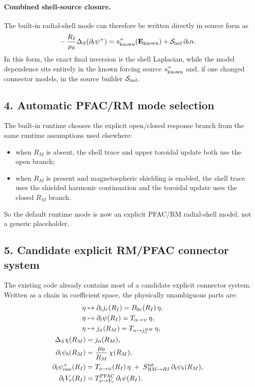 \documentclass[11pt,a4paper]{article}
\begin{document}
\paragraph{Combined shell-source closure.}
The built-in radial-shell mode can therefore be written directly in source
form as
\begin{equation}
-\,\frac{R_I}{\mu_0}\Delta_S(\partial_t\psi^+)
=
s_{\rm known}^+(\mathbf E_{\rm known})
+
\mathcal S_{\rm ind}\,\partial_t\alpha.
\label{eq:runtime_shell_source_split}
\end{equation}
In this form, the exact final inversion is the shell Laplacian, while the
model dependence sits entirely in the known forcing source
\(s_{\rm known}^+\) and, if one changed connector models, in the source
builder \(\mathcal S_{\rm ind}\).

\subsection*{4. Automatic PFAC/RM mode selection}

The built-in  runtime chooses the explicit open/closed
response branch from the same runtime assumptions used elsewhere:
\begin{itemize}
\item when $R_M$ is absent, the shell trace and upper toroidal update both use
the open branch;
\item when $R_M$ is present and magnetospheric shielding is enabled, the shell
trace uses the shielded harmonic continuation and the toroidal update uses the
closed $R_M$ branch.
\end{itemize}
So the default runtime  mode is now an explicit PFAC/RM
radial-shell model, not a generic placeholder.

\subsection*{5. Candidate explicit RM/PFAC connector system}

The existing code already contains most of a candidate explicit connector
system. Written as a chain in coefficient space, the physically unambiguous
parts are:
\begin{align}
\eta
&\mapsto
\partial_t j_r(R_I)
=
B_{0r}(R_I)\,\eta,
\\
\eta
&\mapsto
\partial_t\psi(R_I)
=
T_{\alpha\to\psi}\,\eta,
\\
\eta
&\mapsto
j_n(R_M)
=
T_{\alpha\to j_n^{RM}}\,\eta,
\\
\Delta_S \chi(R_M)
&=
j_n(R_M),
\\
\partial_t\psi_b(R_M)
&=
\frac{\mu_0}{R_M}\,\chi(R_M),
\\
\partial_t\psi_{\rm raw}^+(R_I)
&=
T_{\alpha\to\psi}(R_I)\,\eta
\;+\;
S_{RM\to RI}^{\rm int}\,\partial_t\psi_b(R_M),
\\
\partial_t V_e(R_I)
&=
T_{\psi\to V_e}^{\rm PFAC}\,\partial_t\psi(R_I).
\end{align}
\end{document}
